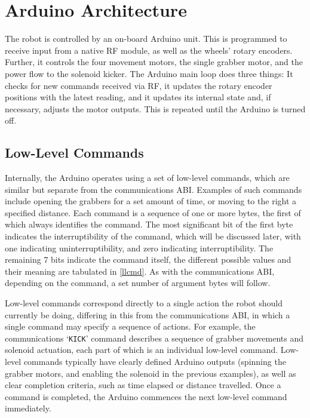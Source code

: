 \section{Arduino Architecture}

The robot is controlled by an on-board Arduino unit. This is programmed to
receive input from a native RF module, as well as the wheels' rotary encoders.
Further, it controls the four movement motors, the single grabber motor, and
the power flow to the solenoid kicker. The Arduino main loop does three
things: It checks for new commands received via RF, it updates the rotary
encoder positions with the latest reading, and it updates its internal state
and, if necessary, adjusts the motor outputs. This is repeated until the
Arduino is turned off.

\subsection{Low-Level Commands}

Internally, the Arduino operates using a set of low-level commands, which are
similar but separate from the communications ABI. Examples of such commands
include opening the grabbers for a set amount of time, or moving to the right a
specified distance. Each command is a sequence of one or more bytes, the first
of which always identifies the command. The most significant bit of the first
byte indicates the interruptibility of the command, which will be discussed
later, with one indicating uninterruptibility, and zero indicating
interruptibility. The remaining 7 bits indicate the command itself, the
different possible values and their meaning are tabulated in \cref{llcmd}. As
with the communications ABI, depending on the command, a set number of argument
bytes will follow.

Low-level commands correspond directly to a single action the robot should
currently be doing, differing in this from the communications ABI, in which a
single command may specify a sequence of actions. For example, the
communications `\texttt{KICK}' command describes a sequence of grabber
movements and solenoid actuation, each part of which is an individual low-level
command. Low-level commands typically have clearly defined Arduino outputs
(spinning the grabber motors, and enabling the solenoid in the previous
examples), as well as clear completion criteria, such as time elapsed or
distance travelled. Once a command is completed, the Arduino commences the next
low-level command immediately.

